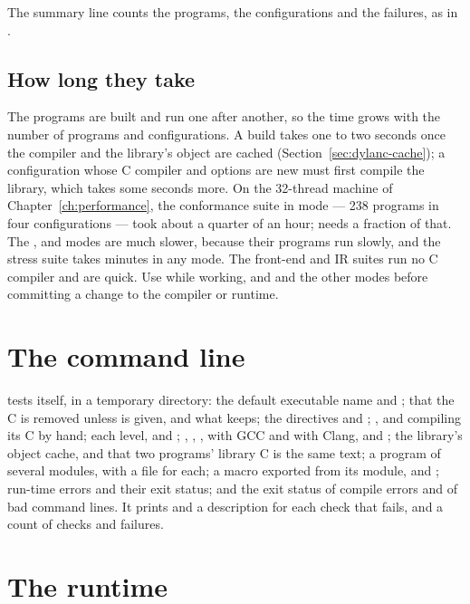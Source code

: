 The summary line counts the programs, the configurations and the
failures, as in .

\subsection{How long they take}\label{sec:test-time}

The programs are built and run one after another, so the time grows
with the number of programs and configurations. A build takes one to two
seconds once the compiler and the library's object are cached
(Section~\ref{sec:dylanc-cache}); a configuration whose C compiler and
options are new must first compile the library, which takes some
seconds more. On the 32-thread machine of Chapter~\ref{ch:performance},
the conformance suite in mode  --- 238 programs in four
configurations --- took about a quarter of an hour;  needs a
fraction of that. The ,  and 
modes are much slower, because their programs run slowly, and the stress
suite takes minutes in any mode. The front-end and IR suites run no C
compiler and are quick. Use  while working, and  and the other
modes before committing a change to the compiler or runtime.

\section{The command line}\label{sec:test-driver}

 tests  itself, in a
temporary directory: the default executable name and ; that the
C is removed unless  is given, and what  keeps; the
 directives and ; , and compiling
its C by hand; each  level,  and ;
, , ,  with GCC and
with Clang, and ; the library's object cache, and that two
programs' library C is the same text; a program of several modules,
with a file for each; a macro exported from its module, and ;
run-time errors and their exit status; and the exit status of compile
errors and of bad command lines. It prints  and a description
for each check that fails, and a count of checks and failures.

\section{The runtime}\label{sec:test-runtime}

